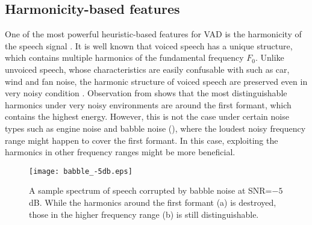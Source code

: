 \subsection{Harmonicity-based features}
One of the most powerful heuristic-based features for VAD is the harmonicity of the speech signal \cite{rabiner1978digital}.
It is well known that voiced speech has a unique structure, which contains multiple harmonics of the fundamental frequency $F_0$.
Unlike unvoiced speech, whose characteristics are easily confusable with such as car, wind and fan noise, the harmonic structure of voiced speech are preserved even in very noisy condition \cite{rabiner1978digital,kristjansson2005voicing}.
Observation from  shows that the most distinguishable harmonics under very noisy environments are around the first formant, which contains the highest energy.
However, this is not the case under certain noise types such as engine noise and babble noise (), where the loudest noisy frequency range might happen to cover the first formant.
In this case, exploiting the harmonics in other frequency ranges might be more beneficial.


\begin{figure}[hh] %
    \centering
    \texttt{[image: babble\_-5db.eps]}            %
    \caption[A sample spectrum of speech corrupted by babble noise at SNR=$-5$dB]{A sample spectrum of speech corrupted by babble noise at SNR=$-5$dB. While the harmonics around the first formant (a) is destroyed, those in the higher frequency range (b) is still distinguishable.}
    \label{Fig:babble_-5db}        %
\end{figure}


